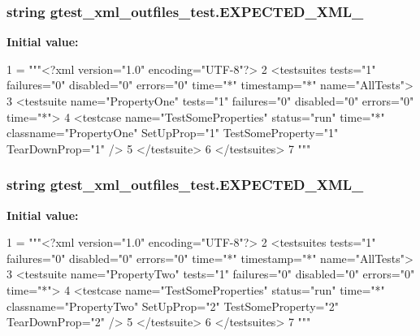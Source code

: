 \subsubsection[{\texorpdfstring{E\+X\+P\+E\+C\+T\+E\+D\+\_\+\+X\+M\+L\+\_\+1}{EXPECTED_XML_1}}]{\setlength{\rightskip}{0pt plus 5cm}string gtest\+\_\+xml\+\_\+outfiles\+\_\+test.\+E\+X\+P\+E\+C\+T\+E\+D\+\_\+\+X\+M\+L\+\_}\hypertarget{namespacegtest__xml__outfiles__test_a9d7b71e2d97dc7705cbe6e4882824c14}{}\label{namespacegtest__xml__outfiles__test_a9d7b71e2d97dc7705cbe6e4882824c14}
{\bfseries Initial value\+:}
\begin{DoxyCode}
1 = \textcolor{stringliteral}{"""<?xml version="1.0" encoding="UTF-8"?>}
2 \textcolor{stringliteral}{<testsuites tests="1" failures="0" disabled="0" errors="0" time="*" timestamp="*" name="AllTests">}
3 \textcolor{stringliteral}{  <testsuite name="PropertyOne" tests="1" failures="0" disabled="0" errors="0" time="*">}
4 \textcolor{stringliteral}{    <testcase name="TestSomeProperties" status="run" time="*" classname="PropertyOne" SetUpProp="1"
       TestSomeProperty="1" TearDownProp="1" />}
5 \textcolor{stringliteral}{  </testsuite>}
6 \textcolor{stringliteral}{</testsuites>}
7 \textcolor{stringliteral}{"""}
\end{DoxyCode}
\subsubsection[{\texorpdfstring{E\+X\+P\+E\+C\+T\+E\+D\+\_\+\+X\+M\+L\+\_\+2}{EXPECTED_XML_2}}]{\setlength{\rightskip}{0pt plus 5cm}string gtest\+\_\+xml\+\_\+outfiles\+\_\+test.\+E\+X\+P\+E\+C\+T\+E\+D\+\_\+\+X\+M\+L\+\_}\hypertarget{namespacegtest__xml__outfiles__test_a765455244a8cd7b3f32a51f0cda4157e}{}\label{namespacegtest__xml__outfiles__test_a765455244a8cd7b3f32a51f0cda4157e}
{\bfseries Initial value\+:}
\begin{DoxyCode}
1 = \textcolor{stringliteral}{"""<?xml version="1.0" encoding="UTF-8"?>}
2 \textcolor{stringliteral}{<testsuites tests="1" failures="0" disabled="0" errors="0" time="*" timestamp="*" name="AllTests">}
3 \textcolor{stringliteral}{  <testsuite name="PropertyTwo" tests="1" failures="0" disabled="0" errors="0" time="*">}
4 \textcolor{stringliteral}{    <testcase name="TestSomeProperties" status="run" time="*" classname="PropertyTwo" SetUpProp="2"
       TestSomeProperty="2" TearDownProp="2" />}
5 \textcolor{stringliteral}{  </testsuite>}
6 \textcolor{stringliteral}{</testsuites>}
7 \textcolor{stringliteral}{"""}
\end{DoxyCode}
